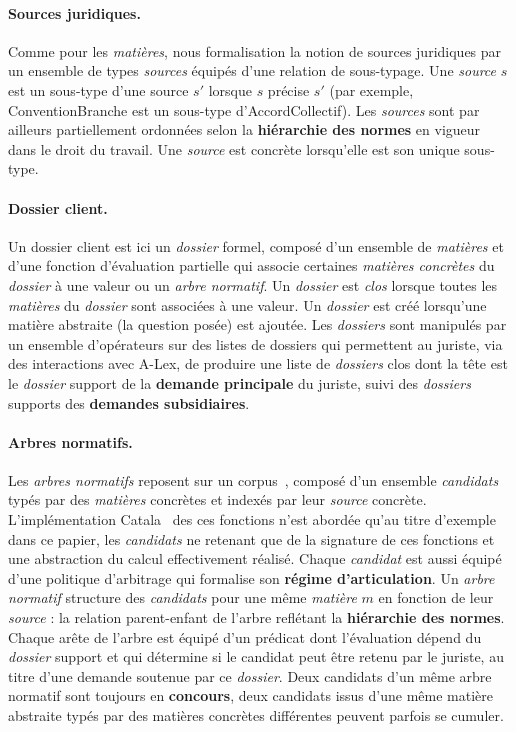 \documentclass[review]{jflart}
\newcommand{\ALex}{A-Lex}
\begin{document}
\paragraph{Sources juridiques.}
Comme pour les \emph{matières}, nous formalisation la notion de sources juridiques par un ensemble de types \emph{sources} équipés d'une relation de sous-typage. Une \emph{source} $s$ est un sous-type d'une source $s'$ lorsque $s$ précise $s'$ (par exemple, \textsf{ConventionBranche} est un sous-type d'\textsf{AccordCollectif}). Les \emph{sources} sont par ailleurs partiellement ordonnées selon la \textbf{hiérarchie des normes} en vigueur dans le droit du travail. Une \emph{source} est concrète lorsqu'elle est son unique sous-type.
\paragraph{Dossier client.}%
Un dossier client est ici un \emph{dossier} formel, composé d'un ensemble de \emph{matières} et d'une fonction d'évaluation partielle qui associe certaines \emph{matières concrètes} du \emph{dossier} à une valeur ou un \emph{arbre normatif}. Un \emph{dossier} est \emph{clos} lorsque toutes les \emph{matières} du \emph{dossier} sont associées à une valeur. Un \emph{dossier} est créé lorsqu'une matière abstraite (la question posée) est ajoutée. Les \emph{dossiers} sont manipulés par un ensemble d'opérateurs sur des listes de dossiers qui permettent au juriste, via des interactions avec \ALex, de produire une liste de \emph{dossiers} clos dont la tête est le \emph{dossier} support de la \textbf{demande principale} du juriste, suivi des \emph{dossiers} supports des \textbf{demandes subsidiaires}.
\paragraph{Arbres normatifs.} %
Les \emph{arbres normatifs} reposent sur un corpus~\cite{corpuslumo}, composé d'un ensemble \emph{candidats} typés par des \emph{matières} concrètes et indexés par leur \emph{source} concrète. L'implémentation Catala~\cite{merigoux2021} des ces fonctions n'est abordée qu'au titre d'exemple dans ce papier, les \emph{candidats} ne retenant que de la signature de ces fonctions et une abstraction du calcul effectivement réalisé. Chaque \emph{candidat} est aussi équipé d'une politique d'arbitrage qui formalise son
\textbf{régime d'articulation}.  Un \emph{arbre normatif} structure des \emph{candidats} pour une même \emph{matière} $m$ en fonction de leur \emph{source} : la relation parent-enfant de l'arbre reflétant la \textbf{hiérarchie des normes}. Chaque arête de l'arbre est équipé d'un prédicat dont l'évaluation dépend du \emph{dossier} support et qui détermine si le candidat peut être retenu par le juriste, au titre d'une demande soutenue par ce \emph{dossier}. Deux candidats d'un même arbre normatif sont toujours en \textbf{concours}, deux candidats issus d'une même matière abstraite typés par des matières concrètes différentes peuvent parfois se cumuler. 
\end{document}
